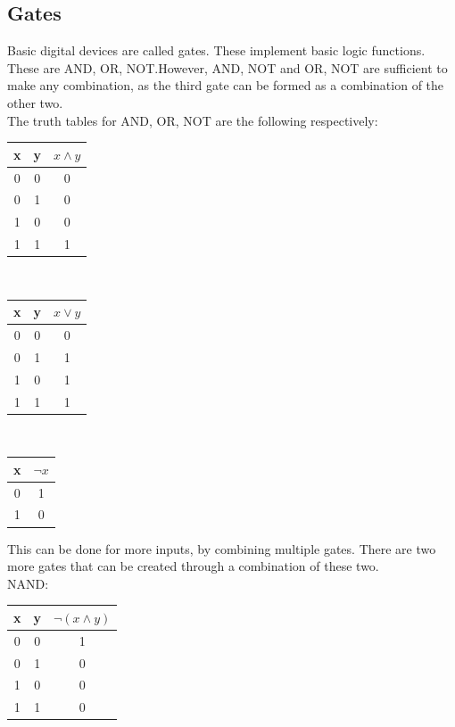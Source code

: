 \documentclass[nobib]{tufte-handout}
\begin{document}
\subsection{Gates}
Basic digital devices are called gates. These implement basic logic functions. These are AND, OR, NOT.However, AND, NOT and OR, NOT are sufficient to make any combination, as the third gate can be formed as a combination of the other two.\\
The truth tables for AND, OR, NOT are the following respectively:\\
\begin{table}
    \centering
       \begin{tabular}{c c|c}
       x&y&{$x\land y$} \\
       \hline
       0&0&0\\
       0&1&0\\
       1&0&0\\
       1&1&1
       \end{tabular}
       \\
       \begin{tabular}{c c|c}
       x&y&{$x\lor y$} \\
       \hline
       0&0&0\\
       0&1&1\\
       1&0&1\\
       1&1&1
       \end{tabular}
       \\
       \begin{tabular}{c|c}
        x&{$\lnot x$} \\
        \hline
        0&1\\
        1&0\\
        \end{tabular}
   \end{table}
This can be done for more inputs, by combining multiple gates. There are two more gates that can be created through a combination of these two.\\
NAND:\\
\begin{table}
    \centering
       \begin{tabular}{c c|c}
       x&y&{$\lnot(x\land y)$} \\
       \hline
       0&0&1\\
       0&1&0\\
       1&0&0\\
       1&1&0
       \end{tabular}
   \end{table}
\end{document}
